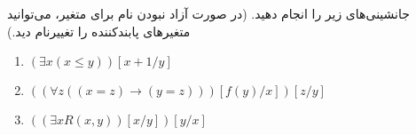 جانشینی‌های زیر را انجام دهید. (در صورت آزاد نبودن نام برای متغیر، می‌توانید متغیرهای پابندکننده را تغییرنام دید.)
\begin{enumerate}[label=(\alph*)]
  \item $(\exists x (x \leq y))[x+1/y]$
  \item $((\forall z ((x = z) \rightarrow (y = z)))[f(y)/x])[z/y]$
  \item $((\exists x R(x, y))[x/y])[y/x]$
\end{enumerate}